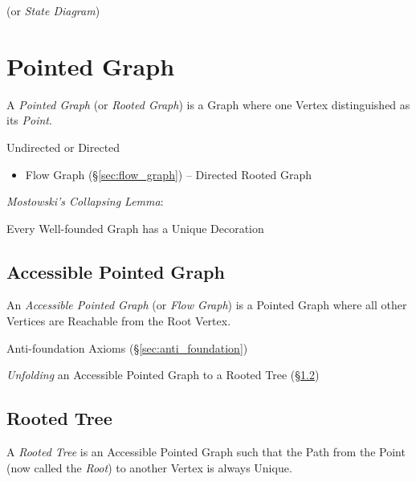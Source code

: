 (or \emph{State Diagram})



\section{Pointed Graph}\label{sec:pointed_graph}

A \emph{Pointed Graph} (or \emph{Rooted Graph}) is a Graph where one
Vertex distinguished as its \emph{Point}.

Undirected or Directed

\begin{itemize}
  \item Flow Graph (\S\ref{sec:flow_graph}) -- Directed Rooted Graph
\end{itemize}

\emph{Mostowski's Collapsing Lemma}: \cite{aczel88}

Every Well-founded Graph has a Unique Decoration %



\subsection{Accessible Pointed Graph}\label{sec:accessible_pointed}

An \emph{Accessible Pointed Graph} (or \emph{Flow Graph}) is a Pointed
Graph where all other Vertices are Reachable from the Root Vertex.

Anti-foundation Axioms (\S\ref{sec:anti_foundation})

\emph{Unfolding} an Accessible Pointed Graph to a Rooted Tree
(\S\ref{sec:rooted_tree})



\subsection{Rooted Tree}\label{sec:rooted_tree}

A \emph{Rooted Tree} is an Accessible Pointed Graph such that the Path
from the Point (now called the \emph{Root}) to another Vertex is
always Unique.

